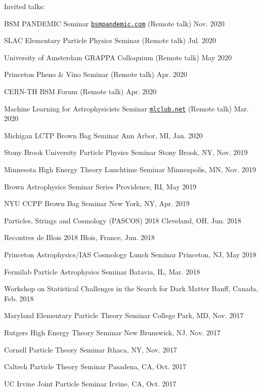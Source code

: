 \documentclass[11pt]{article}
\newenvironment{packed_itemize}{
\begin{itemize}[label=\raisebox{0.25ex}{\tiny$\bullet$}]
  \setlength{\itemsep}{3pt}
  \setlength{\parskip}{0pt}
  \setlength{\parsep}{0pt}}{\end{itemize}
}
\begin{document}
\noindent
Invited talks:
\begin{packed_itemize}
\item BSM PANDEMIC Seminar \href{https://www.bsmpandemic.com/ }{\texttt{bsmpandemic.com}} (Remote talk) \hfill Nov. 2020
\item SLAC Elementary Particle Physics Seminar (Remote talk) \hfill Jul. 2020
\item University of Amsterdam GRAPPA Colloquium (Remote talk) \hfill May 2020
\item Princeton Pheno \& Vino Seminar (Remote talk) \hfill Apr. 2020
\item CERN-TH BSM Forum (Remote talk) \hfill  Apr. 2020
\item Machine Learning for Astrophysicists Seminar \href{https://docs.google.com/document/d/1GGtE-YIuAWlmpKSr38_kyiF-Fklszhkh4FkiYWzBAho/pub}{\texttt{mlclub.net}} (Remote talk) \hfill  Mar. 2020
\item Michigan LCTP Brown Bag Seminar \hfill Ann Arbor, MI, Jan. 2020
\item Stony Brook University Particle Physics Seminar \hfill Stony Brook, NY, Nov. 2019
\item Minnesota High Energy Theory Lunchtime Seminar \hfill  Minneapolis, MN, Nov. 2019
\item Brown Astrophysics Seminar Series \hfill Providence, RI, May 2019
\item NYU CCPP Brown Bag Seminar \hfill New York, NY, Apr. 2019
\item Particles, Strings and Cosmology (PASCOS) 2018 \hfill Cleveland, OH, Jun. 2018
\item Recontres de Blois 2018 \hfill Blois, France, Jun. 2018
\item Princeton Astrophysics/IAS Cosmology Lunch Seminar \hfill Princeton, NJ, May 2018
\item Fermilab Particle Astrophysics Seminar \hfill Batavia, IL, Mar. 2018
\item Workshop on Statistical Challenges in the Search for Dark Matter \hfill Banff, Canada, Feb. 2018
\item Maryland Elementary Particle Theory Seminar \hfill College Park, MD, Nov. 2017
\item Rutgers High Energy Theory Seminar \hfill New Brunswick, NJ, Nov. 2017
\item Cornell Particle Theory Seminar \hfill Ithaca, NY, Nov. 2017
\item Caltech Particle Theory Seminar \hfill Pasadena, CA, Oct. 2017
\item UC Irvine Joint Particle Seminar \hfill Irvine, CA, Oct. 2017

\end{packed_itemize}
\end{document}
